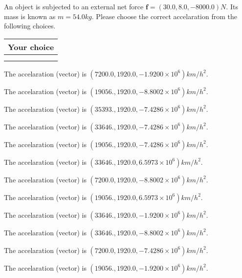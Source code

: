 \documentclass[12pt]{article}
\begin{document}
  
 
An object is subjected to an external net force $\mathbf{f}=(
30.0 ,
8.0,
-8000.0  )N$. Its mass is known as
$m= %
54.0  kg$. Please choose the correct accelaration
from the following choices.
 
  
  
\noindent\hspace{3.0in} \begin{tabular}{|l|}
\hline
Your choice \\
\hline
 \\ 
 \\ 
\hline
\end{tabular}
  
  
 
 
The accelaration (vector) is
$(
7200.0,
1920.0 ,
-1.9200 \times 10^{6}
)km/h^2.
$
 
 
The accelaration (vector) is
$(
19056.,
1920.0 ,
-8.8002 \times 10^{6}
)km/h^2.
$
 
 
The accelaration (vector) is
$(
35393.,
1920.0 ,
-7.4286 \times 10^{6}
)km/h^2.
$
 
 
The accelaration (vector) is
$(
33646.,
1920.0 ,
-7.4286 \times 10^{6}
)km/h^2.
$
 
 
The accelaration (vector) is
$(
19056.,
1920.0 ,
-7.4286 \times 10^{6}
)km/h^2.
$
 
 
The accelaration (vector) is
$(
33646.,
1920.0 ,
6.5973 \times 10^{6}
)km/h^2.
$
 
 
The accelaration (vector) is
$(
7200.0,
1920.0 ,
-8.8002 \times 10^{6}
)km/h^2.
$
 
 
The accelaration (vector) is
$(
19056.,
1920.0 ,
6.5973 \times 10^{6}
)km/h^2.
$
 
 
The accelaration (vector) is
$(
33646.,
1920.0 ,
-1.9200 \times 10^{6}
)km/h^2.
$
 
 
The accelaration (vector) is
$(
33646.,
1920.0 ,
-8.8002 \times 10^{6}
)km/h^2.
$
 
 
The accelaration (vector) is
$(
7200.0,
1920.0 ,
-7.4286 \times 10^{6}
)km/h^2.
$
 
 
The accelaration (vector) is
$(
19056.,
1920.0 ,
-1.9200 \times 10^{6}
)km/h^2.
$
 
\end{document}
